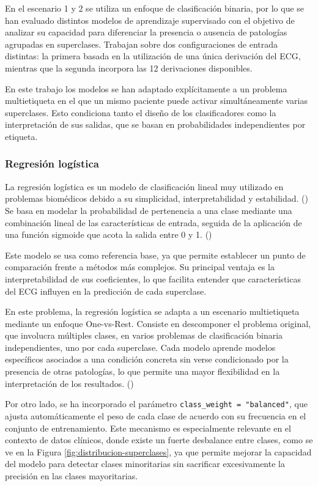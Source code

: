 \documentclass[12pt,a4paper,twoside]{book}
\begin{document}
En el escenario 1 y 2 se utiliza un enfoque de clasificación binaria, por lo que se han evaluado distintos modelos de aprendizaje supervisado con el objetivo de analizar su capacidad para diferenciar la presencia o ausencia de patologías agrupadas en superclases.
Trabajan sobre dos configuraciones de entrada distintas: la primera basada en la utilización de una única derivación del ECG, mientras que la segunda incorpora las 12 derivaciones disponibles.

En este trabajo los modelos se han adaptado explícitamente a un problema multietiqueta en el que un mismo paciente puede activar simultáneamente varias superclases. 
Esto condiciona tanto el diseño de los clasificadores como la interpretación de sus salidas, que se basan en probabilidades independientes por etiqueta.

\subsubsection*{Regresión logística}

La regresión logística es un modelo de clasificación lineal muy utilizado en problemas biomédicos debido a su simplicidad, interpretabilidad y estabilidad. (\cite{lera2025logistic_regression})
Se basa en modelar la probabilidad de pertenencia a una clase mediante una combinación lineal de las características de entrada, seguida de la aplicación de una función sigmoide que acota la salida entre 0 y 1. (\cite{ibm_logistic_regression})

Este modelo se usa como referencia base, ya que permite establecer un punto de comparación frente a métodos más complejos. 
Su principal ventaja es la interpretabilidad de sus coeficientes, lo que facilita entender que características del ECG influyen en la predicción de cada superclase.

En este problema, la regresión logística se adapta a un escenario multietiqueta mediante un enfoque One-vs-Rest. 
Consiste en descomponer el problema original, que involucra múltiples clases, en varios problemas de clasificación binaria independientes, uno por cada superclase.
Cada modelo aprende modelos específicos asociados a una condición concreta sin verse condicionado por la presencia de otras patologías, lo que permite una mayor flexibilidad en la interpretación de los resultados. (\cite{sklearn_ovr_classifier})

Por otro lado, se ha incorporado el parámetro \texttt{class\_weight = "balanced"}, que ajusta automáticamente el peso de cada clase de acuerdo con su frecuencia en el conjunto de entrenamiento. 
Este mecanismo es especialmente relevante en el contexto de datos clínicos, donde existe un fuerte desbalance entre clases, como se ve en la Figura \ref{fig:distribucion-superclases}, ya que permite mejorar la capacidad del modelo para detectar clases minoritarias sin sacrificar excesivamente la precisión en las clases mayoritarias.
\end{document}

